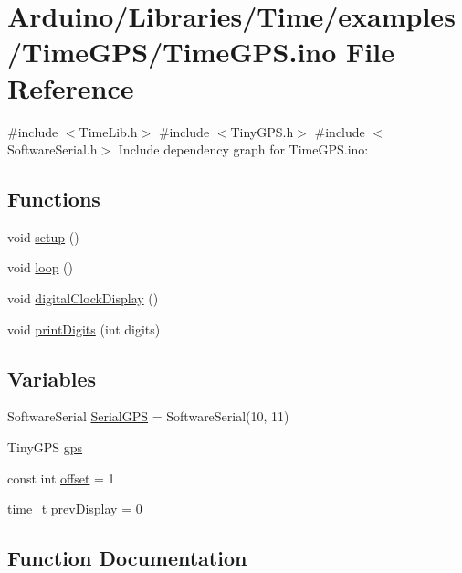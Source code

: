 \hypertarget{_time_g_p_s_8ino}{}\section{Arduino/\+Libraries/\+Time/examples/\+Time\+G\+P\+S/\+Time\+G\+PS.ino File Reference}
\label{_time_g_p_s_8ino}
{\ttfamily \#include $<$Time\+Lib.\+h$>$}\newline
{\ttfamily \#include $<$Tiny\+G\+P\+S.\+h$>$}\newline
{\ttfamily \#include $<$Software\+Serial.\+h$>$}\newline
Include dependency graph for Time\+G\+P\+S.\+ino\+:
\subsection*{Functions}
\begin{DoxyCompactItemize}
\item 
void \hyperlink{_time_g_p_s_8ino_a4fc01d736fe50cf5b977f755b675f11d}{setup} ()
\item 
void \hyperlink{_time_g_p_s_8ino_afe461d27b9c48d5921c00d521181f12f}{loop} ()
\item 
void \hyperlink{_time_g_p_s_8ino_a01f3a72442d58926459c48afce4746e7}{digital\+Clock\+Display} ()
\item 
void \hyperlink{_time_g_p_s_8ino_a772afab0396032477ec7b01d14c774b2}{print\+Digits} (int digits)
\end{DoxyCompactItemize}
\subsection*{Variables}
\begin{DoxyCompactItemize}
\item 
Software\+Serial \hyperlink{_time_g_p_s_8ino_ae826ed5d6893440cdd9b2ed41cedb816}{Serial\+G\+PS} = Software\+Serial(10, 11)
\item 
Tiny\+G\+PS \hyperlink{_time_g_p_s_8ino_a4e2f9a5d1b23f30f530101af71f72744}{gps}
\item 
const int \hyperlink{_time_g_p_s_8ino_a55e90916d2856d0f1c72387a5334ff9a}{offset} = 1
\item 
time\+\_\+t \hyperlink{_time_g_p_s_8ino_a32a8e1cc3c668b1328fd21df4649182f}{prev\+Display} = 0
\end{DoxyCompactItemize}


\subsection{Function Documentation}
\mbox{\label{_time_g_p_s_8ino_a01f3a72442d58926459c48afce4746e7}} 
